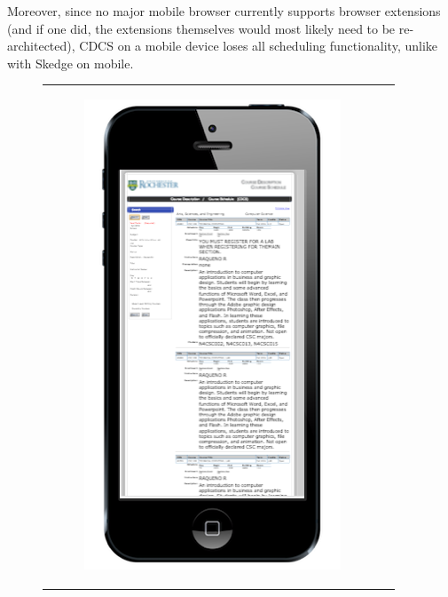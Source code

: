 Moreover, since no major mobile browser currently supports browser extensions (and if one did, the extensions themselves would most likely need to be re-architected), CDCS on a mobile device loses all scheduling functionality, unlike with Skedge on mobile.

\begin{figure}[ht]
  \centering
  \vspace{10pt}
  \begin{tabular}{c c}
    \begin{subfigure}[h]{4.5cm}
      \centering
      \includegraphics[width=1.00\textwidth]{images/cdcs/mobile}

\end{subfigure}
\end{tabular}
\end{figure}
